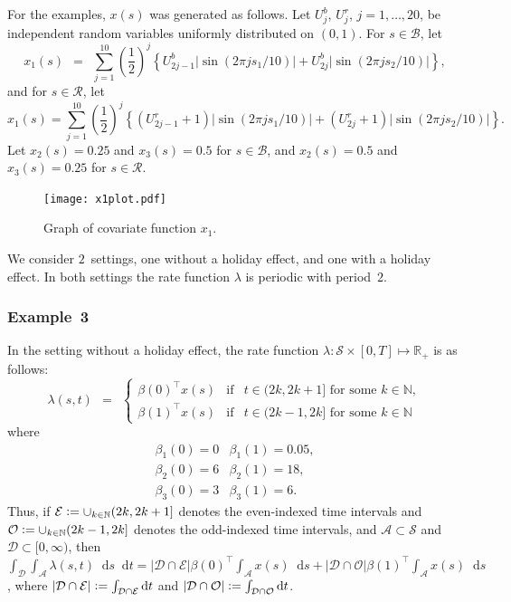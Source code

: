 \documentclass[article]{jss}
\newcommand{\NN}{\mathbb{N}}
\newcommand{\RR}{\mathbb{R}}
\def\defi{\vcentcolon=}
\def\diff{\mathop{}\!\mathrm{d}}
\begin{document}
For the examples, $x(s)$ was generated as follows.
Let $U^{b}_{j}$, $U^{r}_{j}$, $j = 1,\ldots, 20$, be independent random variables uniformly distributed on $(0,1)$.
For $s \in \mathcal{B}$, let
\[
x_{1}(s) \ \ = \ \ \sum_{j=1}^{10} \left(\frac{1}{2}\right)^{j} \left\{U^{b}_{2j-1} |\sin(2 \pi j s_{1} / 10)| + U^{b}_{2j} |\sin(2 \pi j s_{2} / 10)|\right\},
\]
and for $s \in \mathcal{R}$, let
\[
x_{1}(s) = \sum_{j=1}^{10} \left(\frac{1}{2}\right)^{j} \left\{(U^{r}_{2j-1}+1) |\sin(2 \pi j s_{1} / 10)| + (U^{r}_{2j}+1) |\sin(2 \pi j s_{2} / 10)|\right\}.
\]
Let $x_{2}(s) = 0.25$ and $x_{3}(s) = 0.5$ for $s \in \mathcal{B}$, and $x_{2}(s) = 0.5$ and $x_{3}(s) = 0.25$ for $s \in \mathcal{R}$.

\begin{figure}
\centering
\texttt{[image: x1plot.pdf]}
\caption{Graph of covariate function $x_{1}$.\label{fig:x1plot}}
\end{figure}

We consider $2$~settings, one without a holiday effect, and one with a holiday effect.
In both settings the rate function $\lambda$ is periodic with period~$2$.


\subsubsection{Example~3}

In the setting without a holiday effect, the rate function $\lambda : \mathcal{S} \times [0,T] \mapsto \RR_{+}$ is as follows:
\[
\lambda(s,t) \ \ = \ \ \left\{\begin{array}{lcl}
\beta(0)^{\top} x(s) & \mbox{if} & t \in (2k,2k+1] \mbox{ for some } k \in \NN, \\
\beta(1)^{\top} x(s) & \mbox{if} & t \in (2k-1,2k] \mbox{ for some } k \in \NN
\end{array}\right.
\]
where
\[
\begin{array}{ll}
\beta_{1}(0) = 0 & \beta_{1}(1) = 0.05, \\
\beta_{2}(0) = 6 & \beta_{2}(1) = 18, \\
\beta_{3}(0) = 3 & \beta_{3}(1) = 6.
\end{array}
\]
Thus, if $\mathcal{E} \defi \cup_{k \in \NN} (2k,2k+1]$ denotes the even-indexed time intervals and $\mathcal{O} \defi \cup_{k \in \NN} (2k-1,2k]$ denotes the odd-indexed time intervals, and $\mathcal{A} \subset \mathcal{S}$ and $\mathcal{D} \subset [0,\infty)$, then $\int_{\mathcal{D}} \int_{\mathcal{A}} \lambda(s,t) \diff s \diff t = \left|\mathcal{D} \cap \mathcal{E}\right| \beta(0)^{\top} \int_{\mathcal{A}} x(s) \diff s + \left|\mathcal{D} \cap \mathcal{O}\right| \beta(1)^{\top} \int_{\mathcal{A}} x(s) \diff s$, where $\left|\mathcal{D} \cap \mathcal{E}\right| \defi \int_{\mathcal{D} \cap \mathcal{E}} \diff t$ and $\left|\mathcal{D} \cap \mathcal{O}\right| \defi \int_{\mathcal{D} \cap \mathcal{O}} \diff t$.
\end{document}
